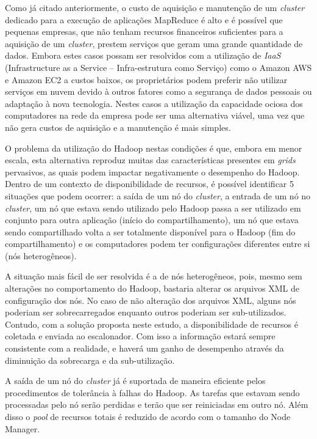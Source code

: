 Como já citado anteriormente, o custo de aquisição e manutenção de um \textit{cluster} dedicado para a execução de aplicações MapReduce é alto e é possível que pequenas empresas, que não tenham recursos financeiros suficientes para a aquisição de um \textit{cluster}, prestem serviços que geram uma grande quantidade de dados. Embora estes casos possam ser resolvidos com a utilização de \textit{IaaS} (Infrastructure as a Service -- Infra-estrutura como Serviço) como o Amazon AWS \cite{amazonAWS} e Amazon EC2\cite{amazonEC2} a custos baixos, os proprietários podem preferir não utilizar serviços em nuvem devido à outros fatores como a segurança de dados pessoais ou adaptação à nova tecnologia. Nestes casos a utilização da capacidade ociosa dos computadores na rede da empresa pode ser uma alternativa viável, uma vez que não gera custos de aquisição e a manutenção é mais simples.

O problema da utilização do Hadoop nestas condições é que, embora em menor escala, esta alternativa reproduz muitas das características presentes em \textit{grids} pervasivos, as quais podem impactar negativamente o desempenho do Hadoop. Dentro de um contexto de disponibilidade de recursos, é possível identificar 5 situações que podem ocorrer: a saída de um nó do \textit{cluster}, a entrada de um nó no \textit{cluster}, um nó que estava sendo utilizado pelo Hadoop passa a ser utilizado em conjunto para outra aplicação (início do compartilhamento), um nó que estava sendo compartilhado volta a ser totalmente disponível para o Hadoop (fim do compartilhamento) e os computadores podem ter configurações diferentes entre si (nós heterogêneos).

A situação mais fácil de ser resolvida é a de nós heterogêneos, pois, mesmo sem alterações no comportamento do Hadoop, bastaria alterar os arquivos XML de configuração dos nós. No caso de não alteração dos arquivos XML, alguns nós poderiam ser sobrecarregados enquanto outros poderiam ser sub-utilizados. Contudo, com a solução proposta neste estudo, a disponibilidade de recursos é coletada e enviada ao escalonador. Com isso a informação estará sempre consistente com a realidade, e haverá um ganho de desempenho através da diminuição da sobrecarga e da sub-utilização.

A saída de um nó do \textit{cluster} já é suportada de maneira eficiente pelos procedimentos de tolerância à falhas do Hadoop. As tarefas que estavam sendo processadas pelo nó serão perdidas e terão que ser reiniciadas em outro nó. Além disso o \textit{pool} de recursos totais é reduzido de acordo com o tamanho do Node Manager.

